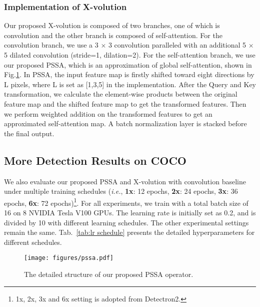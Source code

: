 \documentclass{article}
\begin{document}
\subsubsection{Implementation of X-volution}

Our proposed X-volution is composed of two branches, one of which is convolution and the other branch is composed of self-attention. For the convolution branch, we use a 3 $\times$ 3 convolution paralleled with an additional 5 $\times$ 5 dilated convolution (stride=1, dilation=2). For the self-attention branch, we use our proposed PSSA, which is an approximation of global self-attention, shown in Fig.\ref{fig:pssa}. In PSSA, the input feature map is firstly shifted toward eight directions by L pixels, where L is set as [1,3,5] in the implementation. After the Query and Key transformation, we calculate the element-wise products between the original feature map and the shifted feature map to get the transformed features. Then we perform weighted addition on the transformed features to get an approximated self-attention map. A batch normalization layer is stacked before the final output.

\subsection{More Detection Results on COCO}
\label{supp_sec2}



We also evaluate our proposed PSSA and X-volution with convolution baseline under multiple training schedules (\emph{i.e.}, \textbf{1x}: 12 epochs, \textbf{2x}: 24 epochs, \textbf{3x}: 36 epochs, \textbf{6x}: 72 epochs)\footnote{1x, 2x, 3x and 6x setting is adopted from Detectron2. \vspace{2mm}}.
For all experiments, we train with a total batch size of 16 on 8 NVIDIA Tesla V100 GPUs. The learning rate is initially set as 0.2, and is divided by 10 with different learning schedules. The other experimental settings remain the same. Tab.~\ref{tab:lr schedule} presents the detailed hyperparameters for different schedules.

\begin{figure}[t]	
    \centering	
	\texttt{[image: figures/pssa.pdf]}
	\small
	\caption{The detailed structure of our proposed PSSA operator.}
    \label{fig:pssa}
\end{figure}
\end{document}
